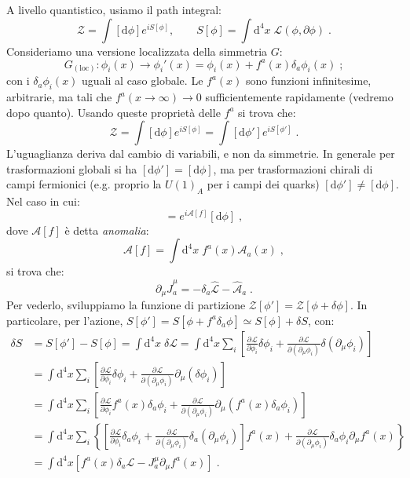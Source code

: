 \documentclass[12pt,a4paper]{article}
\theoremstyle{definition}
\newcommand{\pdev}[3][]{\frac{\partial^{#1} #2}{\partial #3^{#1}}}
\newcommand{\lag}{\mathcal{L}}
\newcommand{\diff}[1][]{\mathrm{d}#1}
\newcommand{\zpart}{\mathcal{Z}}
\numberwithin{equation}{section}
\begin{document}
A livello quantistico, usiamo il path integral:
$$
\zpart=\int[\diff{\phi}]e^{iS[\phi]},\qquad S[\phi]=\int\diff^4{x}\;\lag(\phi,\partial\phi)\;.
$$
Consideriamo una versione localizzata della simmetria $G$:
\begin{equation}
G_{(\mathrm{loc})}: \phi_i(x)\to\phi_i'(x)=\phi_i(x)+f^a(x)\delta_a\phi_i(x)\;;
\end{equation}
con i $\delta_a\phi_i(x)$ uguali al caso globale. Le $f^a(x)$ sono funzioni infinitesime, arbitrarie, ma tali che $f^a(x\to\infty)\to 0$ sufficientemente rapidamente (vedremo dopo quanto). Usando queste proprietà delle $f^a$ si trova che:
\begin{equation}
\zpart=\int[\diff{\phi}]e^{iS[\phi]}=\int[\diff{\phi'}]e^{iS[\phi']}\;.
\end{equation}
L'uguaglianza deriva dal cambio di variabili, e non da simmetrie. In generale per trasformazioni globali si ha $[\diff{\phi}']=[\diff{\phi}]$, ma per trasformazioni chirali di campi fermionici (e.g. proprio la $U(1)_A$ per i campi dei quarks) $[\diff{\phi}']\ne [\diff{\phi}]$. \\
Nel caso in cui:
\begin{equation}
[\diff{\phi}']=e^{i\mathcal{A}[f]}[\diff{\phi}]\;,
\end{equation}
dove $\mathcal{A}[f]$ è detta \emph{anomalia}:
\begin{equation}
\mathcal{A}[f]=\int\diff^4{x}\;f^a(x)\mathcal{A}_a(x)\;,
\end{equation}
si trova che:
\begin{equation}
\partial_{\mu}\hat{J}^{\mu}_a=-\delta_a\hat{\lag}-\hat{\mathcal{A}}_a\;.
\end{equation}
Per vederlo, sviluppiamo la funzione di partizione $\zpart[\phi']=\zpart[\phi+\delta\phi]$. In particolare, per l'azione, $S[\phi']=S[\phi+f^a\delta_a\phi]\simeq S[\phi]+\delta S$, con:
\begin{align*}
\delta S &= S[\phi']-S[\phi]=\int\diff^4{x}\;\delta\lag=\int\diff^4{x}\sum_i\left[\pdev{\lag}{\phi_i}\delta\phi_i+\pdev{\lag}{(\partial_{\mu}\phi_i)}\delta(\partial_{\mu}\phi_i)\right] \\
&=\int\diff^4{x}\sum_i\left[\pdev{\lag}{\phi_i}\delta\phi_i+\pdev{\lag}{(\partial_{\mu}\phi_i)}\partial_{\mu}(\delta\phi_i)\right] \\
&=\int\diff^4{x}\sum_i\left[\pdev{\lag}{\phi_i}f^a(x)\delta_a\phi_i+\pdev{\lag}{(\partial_{\mu}\phi_i)}\partial_{\mu}(f^a(x)\delta_a\phi_i)\right] \\
&=\int\diff^4{x}\sum_i\left\{\left[\pdev{\lag}{\phi_i}\delta_a\phi_i+\pdev{\lag}{(\partial_{\mu}\phi_i)}\delta_a(\partial_{\mu}\phi_i)\right]f^a(x)+\pdev{\lag}{(\partial_{\mu}\phi_i)}\delta_a\phi_i\partial_{\mu}f^a(x)\right\} \\
&=\int\diff^4{x}\left[f^a(x)\delta_a\lag-J^{\mu}_a\partial_{\mu}f^a(x)\right]\;.
\end{align*}
\end{document}
